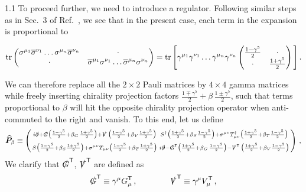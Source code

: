 \documentclass[a4paper,12pt]{article}
\def\mat#1{\boldsymbol{#1}}
\def\T{\textsf{T}}
\def\X{\mat{\widehat{P}}}
\begin{document}
\begin{spacing}{1.1}
To proceed further, we need to introduce a regulator. Following similar steps as in Sec.~3 of Ref.~\cite{Paper1}, we see that in the present case, each term in the expansion is proportional to
\begin{small}
\begin{equation}
\tr \mqty(
\sigma^{\mu_1} \overline{\sigma}^{\nu_1} \dots \sigma^{\mu_n} \overline{\sigma}^{\nu_n} & \cdot \\
\cdot & \overline{\sigma}^{\mu_1} \sigma^{\nu_1} \dots \overline{\sigma}^{\mu_n} \sigma^{\nu_n})
= \tr \Bigg[\gamma^{\mu_1}\gamma^{\nu_1} \dots \gamma^{\mu_n}\gamma^{\nu_n} 
\begin{pmatrix}
\tfrac{1-\gamma^5}{2} & \cdot \\
\cdot & \tfrac{1+\gamma^5}{2}
\end{pmatrix} \Bigg] \,.
\end{equation}
\end{small}
We can therefore replace all the $2\times2$ Pauli matrices by $4\times4$ gamma matrices while freely inserting chirality projection factors $\frac{1\mp\gamma^5}{2}+\beta\,\frac{1\pm\gamma^5}{2}$,  such that terms proportional to $\beta$ will hit the opposite chirality projection operator when anti-commuted to the right and vanish. To this end, let us define
\begin{equation}
\X_\beta \equiv
\left(
\begin{smallmatrix}
	i\slashed{\partial} +\slashed{G} \bigl(\frac{1-\gamma^5}{2} + \beta_G\, \frac{1+\gamma^5}{2}\bigr) +\slashed{V} \,\bigl(\frac{1-\gamma^5}{2} + \beta_V \frac{1+\gamma^5}{2}\bigr) &
	S^\dagger\bigl(\frac{1+\gamma^5}{2} + \beta_S \frac{1-\gamma^5}{2}\bigr) +\sigma^{\mu\nu} T^\dagger_{\mu\nu} \bigl(\frac{1+\gamma^5}{2} + \beta_T \frac{1-\gamma^5}{2}\bigr) \\[4pt]
	S\bigl(\frac{1-\gamma^5}{2} + \beta_S \frac{1+\gamma^5}{2}\bigr) +\sigma^{\mu\nu} T_{\mu\nu} \bigl(\frac{1-\gamma^5}{2} + \beta_T \frac{1+\gamma^5}{2}\bigr) & 
	i\slashed{\partial} -\slashed{G}^\T \bigl(\frac{1+\gamma^5}{2} + \beta_G\, \frac{1-\gamma^5}{2}\bigr) -\slashed{V}^\T \,\bigl(\frac{1+\gamma^5}{2} + \beta_V \frac{1-\gamma^5}{2}\bigr)
\end{smallmatrix}\right) \,,
\label{eq:X_beta}
\end{equation}
We clarify that $\slashed{G}^\T$, $\slashed{V}^\T$ are defined as
\begin{equation}
\slashed{G}^\T \equiv \gamma^\mu G_\mu^\T \,,\qquad
\qquad
\slashed{V}^\T \equiv \gamma^\mu V_\mu^\T \,,
\label{eqn:GVslT}
\end{equation}

\end{spacing}
\end{document}

